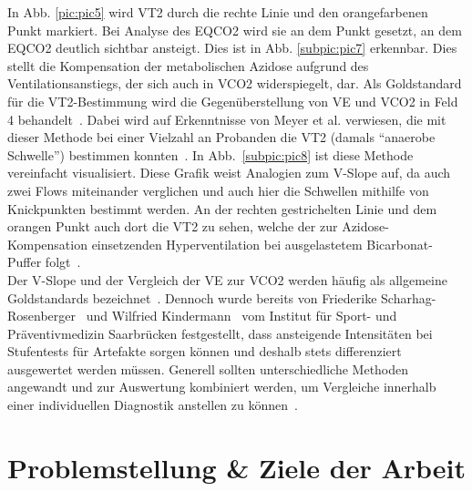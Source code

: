 In Abb. \ref{pic:pic5} wird VT2 durch die rechte Linie und den orangefarbenen Punkt markiert. Bei Analyse des \acs{EQCO2} wird sie an dem Punkt gesetzt, an dem \acs{EQCO2} deutlich sichtbar ansteigt. Dies ist in Abb. \ref{subpic:pic7} erkennbar. Dies stellt die Kompensation der metabolischen Azidose aufgrund des Ventilationsanstiegs, der sich auch in \acs{VCO2} widerspiegelt, dar. Als Goldstandard für die VT2-Bestimmung wird die Gegenüberstellung von \acs{VE} und \acs{VCO2} in Feld 4 behandelt~\cite{ScharhagRosenberger.2013}. Dabei wird auf Erkenntnisse von Meyer et al. verwiesen, die mit dieser Methode bei einer Vielzahl an Probanden die VT2 (damals "`anaerobe Schwelle"') bestimmen konnten~\cite{Meyer.2005}. In Abb.~\ref{subpic:pic8} ist diese Methode vereinfacht visualisiert. Diese Grafik weist Analogien zum V-Slope auf, da auch zwei Flows miteinander verglichen und auch hier die Schwellen mithilfe von Knickpunkten bestimmt werden. An der rechten gestrichelten Linie und dem orangen Punkt auch dort die VT2 zu sehen, welche der zur Azidose-Kompensation einsetzenden Hyperventilation bei ausgelastetem Bicarbonat-Puffer folgt~\cite{ScharhagRosenberger.2010}.\\
Der V-Slope und der Vergleich der \acs{VE} zur \acs{VCO2} werden häufig als allgemeine Goldstandards bezeichnet~\cite{ScharhagRosenberger.2013}. Dennoch wurde bereits von Friederike Scharhag-Rosenberger~\cite{ScharhagRosenberger.2010} und Wilfried Kindermann~\cite{Kindermann.2004} vom Institut für Sport- und Präventivmedizin Saarbrücken festgestellt, dass ansteigende Intensitäten bei Stufentests für Artefakte sorgen können und deshalb stets differenziert ausgewertet werden müssen. Generell sollten unterschiedliche Methoden angewandt und zur Auswertung kombiniert werden, um Vergleiche innerhalb einer individuellen Diagnostik anstellen zu können~\cite{ScharhagRosenberger.2010}.
\section{Problemstellung \& Ziele der Arbeit}

